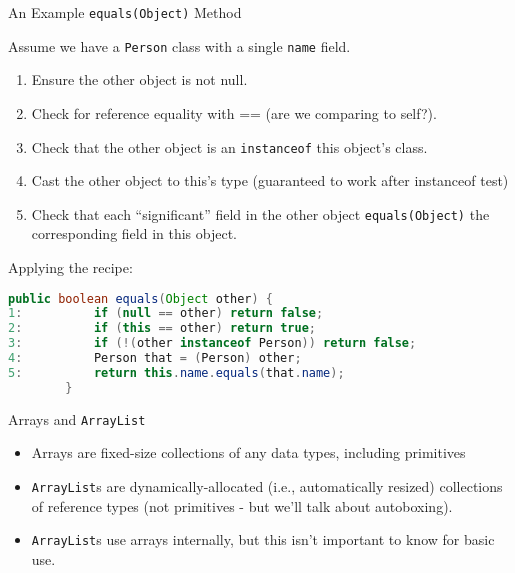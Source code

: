 \documentclass{beamer}
\begin{document}
\begin{frame}[fragile]{An Example {\tt equals(Object)} Method}

Assume we have a {\tt Person} class with a single {\tt name} field.
\begin{enumerate}
\item Ensure the other object is not null.
\item Check for reference equality with == (are we comparing to self?).
\item Check that the other object is an {\tt instanceof} this object's class.
\item Cast the other object to this's type (guaranteed to work after instanceof test)
\item Check that each ``significant'' field in the other object {\tt equals(Object)} the corresponding field in this object.
\end{enumerate}
Applying the recipe:
\begin{lstlisting}[language=Java]
        public boolean equals(Object other) {
1:          if (null == other) return false;
2:          if (this == other) return true;
3:          if (!(other instanceof Person)) return false;
4:          Person that = (Person) other;
5:          return this.name.equals(that.name);
        }
\end{lstlisting}

\end{frame}

\begin{frame}[fragile]{Arrays and {\tt ArrayList}}


\begin{itemize}
\item Arrays are fixed-size collections of any data types, including primitives
\item {\tt ArrayList}s are dynamically-allocated (i.e., automatically resized) collections of reference types (not primitives - but we'll talk about autoboxing).
\item {\tt ArrayList}s use arrays internally, but this isn't important to know for basic use.
\end{itemize}


\end{frame}
\end{document}
